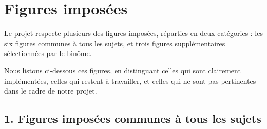 \chapter{Figures imposées}

Le projet respecte plusieurs des figures imposées, réparties en deux catégories : les six figures communes à tous les sujets, et trois figures supplémentaires sélectionnées par le binôme.

Nous listons ci-dessous ces figures, en distinguant celles qui sont clairement implémentées, celles qui restent à travailler, et celles qui ne sont pas pertinentes dans le cadre de notre projet.

\section*{1. Figures imposées communes à tous les sujets}

